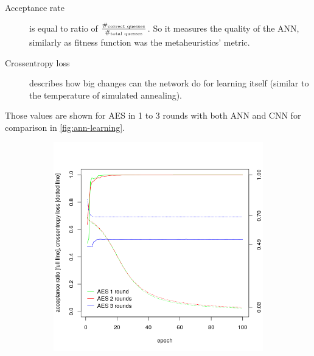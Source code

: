 \documentclass[
  print, %
  Table,   %
  nolof,     %
  nolot,     %
  11pt, %
  oneside  %
]{fithesis3}
\begin{document}
\begin{description}
    \item[Acceptance rate] is equal to ratio of $\frac{\#_{\textnormal{correct quesses}}}{\#_{\textnormal{total quesses}}}$. So it measures the quality of the ANN, similarly as fitness function was the metaheuristics' metric.
    \item[Crossentropy loss] describes how big changes can the network do for learning itself (similar to the temperature of simulated annealing).
\end{description}

Those values are shown for AES in 1 to 3 rounds with both ANN and CNN for comparison in \cref{fig:ann-learning}.


\begin{figure}[H]
\begin{changemargin}{-3cm}{-3cm}
\centering
\begin{subfigure}{.6\textwidth}
  \centering
  \includegraphics[width=.98\textwidth]{./graphics/ann/ann.png}
  \label{fig:ann-learning-ann}
\end{subfigure}%
\begin{subfigure}{.6\textwidth}
  \centering

\end{subfigure}
\end{changemargin}
\end{figure}
\end{document}
